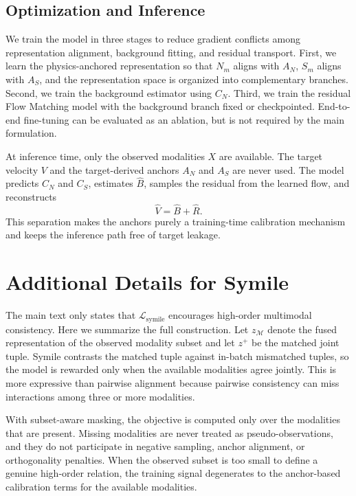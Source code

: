 \documentclass[letterpaper]{article}
\begin{document}
\subsection{Optimization and Inference}
We train the model in three stages to reduce gradient conflicts among representation alignment, background fitting, and residual transport. First, we learn the physics-anchored representation so that $N_m$ aligns with $A_N$, $S_m$ aligns with $A_S$, and the representation space is organized into complementary branches. Second, we train the background estimator using $C_N$. Third, we train the residual Flow Matching model with the background branch fixed or checkpointed. End-to-end fine-tuning can be evaluated as an ablation, but is not required by the main formulation.

At inference time, only the observed modalities $X$ are available. The target velocity $V$ and the target-derived anchors $A_N$ and $A_S$ are never used. The model predicts $C_N$ and $C_S$, estimates $\hat B$, samples the residual from the learned flow, and reconstructs
\begin{equation}
\hat V=\hat B+\hat R.
\end{equation}
This separation makes the anchors purely a training-time calibration mechanism and keeps the inference path free of target leakage.

\appendix
\section{Additional Details for Symile}
The main text only states that $\mathcal L_{\mathrm{symile}}$ encourages high-order multimodal consistency. Here we summarize the full construction. Let $z_{\mathcal M}$ denote the fused representation of the observed modality subset and let $z^+$ be the matched joint tuple. Symile contrasts the matched tuple against in-batch mismatched tuples, so the model is rewarded only when the available modalities agree jointly. This is more expressive than pairwise alignment because pairwise consistency can miss interactions among three or more modalities.

With subset-aware masking, the objective is computed only over the modalities that are present. Missing modalities are never treated as pseudo-observations, and they do not participate in negative sampling, anchor alignment, or orthogonality penalties. When the observed subset is too small to define a genuine high-order relation, the training signal degenerates to the anchor-based calibration terms for the available modalities.
\end{document}
